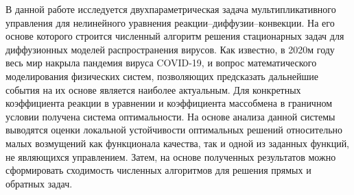 В данной работе исследуется двухпараметрическая задача мультипликативного управления для нелинейного уравнения реакции--диффузии--конвекции. На его основе которого строится численный алгоритм решения стационарных задач для диффузионных моделей распространения вирусов. Как известно, в 2020м году весь мир накрыла пандемия вируса COVID-19, и вопрос математического моделирования физических систем, позволяющих предсказать дальнейшие события на их основе является наиболее актуальным. Для конкретных коэффициента реакции в уравнении и коэффициента массобмена в граничном условии получена система оптимальности. На основе анализа данной системы выводятся оценки локальной устойчивости оптимальных решений относительно малых возмущений как функционала качества, так и одной из заданных функций, не являющихся управлением. Затем, на основе полученных результатов можно сформировать сходимость численных алгоритмов для решения прямых и обратных задач.

\pagebreak